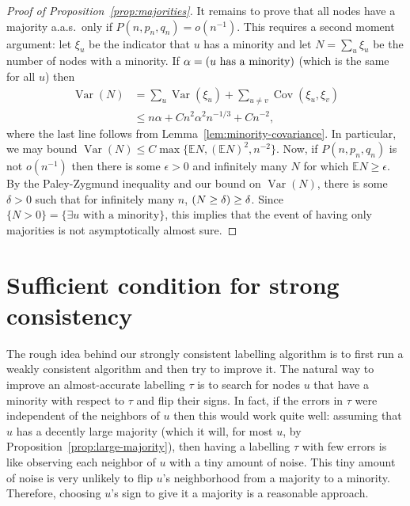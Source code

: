 \documentclass[EJP]{ejpecp}
\newcommand{\E}{\mathbb{E}}
\newcommand{\1}[1]{\mathbbm{1}_{\{#1\}}}
\let\Pr\relax
\DeclareMathOperator{\Pr}{Pr}
\DeclareMathOperator{\Var}{Var}
\DeclareMathOperator{\Cov}{Cov}
\begin{document}
\begin{proof}[Proof of Proposition~\ref{prop:majorities}]
  It remains to prove that all nodes have a majority a.a.s.\ only if
  $P(n, p_n, q_n) = o(n^{-1})$. This requires a second moment argument:
  let $\xi_u$ be the indicator that $u$ has a minority
  and let $N = \sum_u \xi_u$ be the number of nodes with a minority. If
  $\alpha = \Pr(\text{$u$ has a minority})$ (which is the same for all $u$) then
  \begin{align*}
   \Var(N)
   &= \sum_u \Var(\xi_u) + \sum_{u \ne v} \Cov(\xi_u, \xi_v) \\
   &\le n \alpha + C n^2 \alpha^2 n^{-1/3} + C n^{-2},
  \end{align*}
  where the last line follows from Lemma~\ref{lem:minority-covariance}.
  In particular, we may bound $\Var(N) \le C \max\{\E N, (\E N)^2, n^{-2}\}$. Now, if
  $P(n, p_n, q_n)$ is not $o(n^{-1})$ then there is some $\epsilon > 0$
  and infinitely many $N$ for which $\E N \ge \epsilon$. By
  the Paley-Zygmund inequality and our bound on $\Var(N)$,
  there is some $\delta > 0$ such that
  for infinitely many $n$, $\Pr(N \ge \delta) \ge \delta$.
  Since $\{N > 0\} = \{\exists u \text{ with a minority}\}$, this implies that the event of having
  only majorities is not asymptotically almost sure.
\end{proof}


\section{Sufficient condition for strong consistency}\label{sec:sufficient}

The rough idea behind our strongly consistent labelling algorithm is to
first run a weakly consistent algorithm and then try to improve it.
The natural way to improve an almost-accurate labelling $\tau$
is to search for nodes $u$ that have a minority with respect to $\tau$
and flip their signs. In fact, if the errors in $\tau$ were independent
of the neighbors of $u$ then this would work quite well:
assuming that $u$ has a decently large majority (which it will, for
most $u$, by Proposition~\ref{prop:large-majority}), then having a
labelling $\tau$ with few errors is like observing each neighbor of $u$
with a tiny amount of noise. This tiny amount of noise is very unlikely
to flip $u$'s neighborhood from a majority to a minority. Therefore,
choosing $u$'s sign to give it a majority is a reasonable approach.
\end{document}
